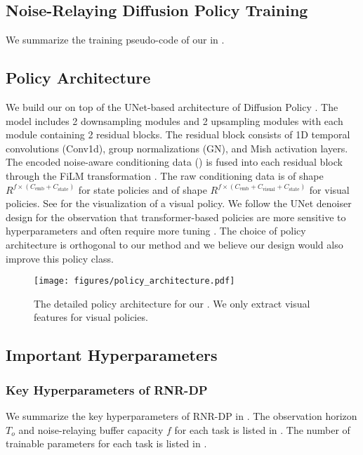 \subsection{Noise-Relaying Diffusion Policy Training}
We summarize the training pseudo-code of our \ours in .


\subsection{Policy Architecture}
\label{sup:policy_architecture}
We build our \ours on top of the UNet-based architecture of Diffusion Policy \citep{chi2023diffusion}. The model includes 2 downsampling modules and 2 upsampling modules with each module containing 2 residual blocks. The residual block consists of 1D temporal convolutions (Conv1d), group normalizations (GN), and Mish activation layers. The encoded noise-aware conditioning data () is fused into each residual block through the FiLM transformation \citep{perez2018film}. The raw conditioning data is of shape $R^{f \times (C_{\mathrm{emb}} + C_{\mathrm{state}})}$ for state policies and of shape $R^{f \times (C_{\mathrm{emb}} + C_{\mathrm{visual}} + C_{\mathrm{state}})}$ for visual policies. See  for the visualization of a visual policy. We follow the UNet denoiser design for the observation that transformer-based policies are more sensitive to hyperparameters and often require more tuning \citep{chi2023diffusion}. The choice of policy architecture is orthogonal to our method and we believe our design would also improve this policy class.

\begin{figure}[!t]
    \centering
    \texttt{[image: figures/policy\_architecture.pdf]}
    \caption{The detailed policy architecture for our \ours. We only extract visual features for visual policies.
    }  
    \label{fig:policy_architecture}
\end{figure}

\subsection{Important Hyperparameters}

\subsubsection{Key Hyperparameters of RNR-DP}
We summarize the key hyperparameters of RNR-DP in .
The observation horizon $T_o$ and noise-relaying buffer capacity $f$ for each task is listed in .
The number of trainable parameters for each task is listed in .


